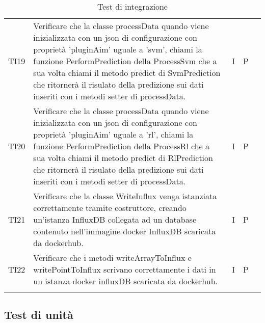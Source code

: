 \begin{longtable} {
		>{}p{15mm} 
		>{}p{79.5mm}
		>{}p{15mm} 
		>{}p{15mm}
		>{}p{0mm}}
	TI19	& Verificare che la classe processData quando viene inizializzata con un json di configurazione con proprietà 'pluginAim' uguale a 'svm', chiami la funzione PerformPrediction della ProcessSvm che a sua volta chiami il metodo predict di SvmPrediction che ritornerà il risulato della predizione sui dati inseriti con i metodi setter di processData.& I & P &\TBstrut \\ [2mm]
	TI20	& Verificare che la classe processData quando viene inizializzata con un json di configurazione con proprietà 'pluginAim' uguale a 'rl', chiami la funzione PerformPrediction della ProcessRl che a sua volta chiami il metodo predict di RlPrediction che ritornerà il risulato della predizione sui dati inseriti con i metodi setter di processData.& I & P &\TBstrut \\ [2mm]
	TI21	& Verificare che la classe WriteInflux venga istanziata correttamente tramite costruttore, creando un'istanza InfluxDB collegata ad un database contenuto nell'immagine docker InfluxDB scaricata da dockerhub.& I & P &\TBstrut \\ [2mm]
	TI22	& Verificare che i metodi writeArrayToInflux e writePointToInflux scrivano correttamente i dati in un istanza docker influxDB scaricata da dockerhub.& I & P &\TBstrut \\ [2mm]
	
	\rowcolor{white}
	\caption{Test di integrazione}
\end{longtable}



\subsection{Test di unità}

